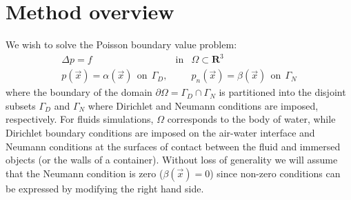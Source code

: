 


\section{Method overview}

We wish to solve the Poisson boundary value problem:
\begin{eqnarray}
\Delta p=f&\mbox{in}&\Omega\subset\mathbf{R}^3\\
p(\vec{x})=\alpha(\vec{x})\ \ \mbox{on}\ \ \Gamma_D\label{eqn_problem},&&p_n(\vec{x})=\beta(\vec{x})\ \ \mbox{on}\ \ \Gamma_N\nonumber
\end{eqnarray}
where the boundary of the domain $\partial\Omega=\Gamma_D\cap\Gamma_N$ is partitioned into the disjoint subsets $\Gamma_D$ and $\Gamma_N$ where Dirichlet and Neumann conditions are
imposed, respectively. For fluids simulations, $\Omega$ corresponds to the body of water, while
Dirichlet boundary conditions are imposed on the air-water interface and Neumann conditions at the surfaces of contact between the fluid and immersed objects (or the walls of
a container). Without loss of generality we will assume that the Neumann condition is zero ($\beta(\vec{x})$$=$$0$) since non-zero conditions can be expressed by modifying
the right hand side.

